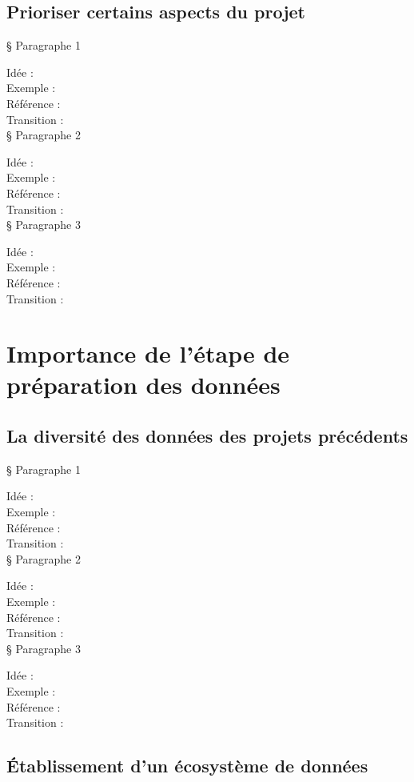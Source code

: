 \subsection{Prioriser certains aspects du projet}

§ Paragraphe 1

Idée :\\
Exemple :\\
Référence :\\
Transition :\\

§ Paragraphe 2

Idée :\\
Exemple :\\
Référence :\\
Transition :\\

§ Paragraphe 3

Idée :\\
Exemple :\\
Référence :\\
Transition :\\

 \section{Importance de l’étape de préparation des données}
    \subsection{La diversité des données des projets précédents}

§ Paragraphe 1

Idée :\\
Exemple :\\
Référence :\\
Transition :\\

§ Paragraphe 2

Idée :\\
Exemple :\\
Référence :\\
Transition :\\

§ Paragraphe 3

Idée :\\
Exemple :\\
Référence :\\
Transition :\\

\subsection{Établissement d’un écosystème de données}

